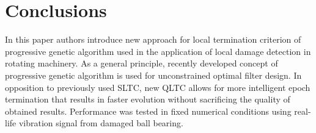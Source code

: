 \documentclass{svproc}
\begin{document}
\section{Conclusions}

In this paper authors introduce new approach for local termination criterion of progressive genetic algorithm used in the application of local damage detection in rotating machinery. As a general principle, recently developed concept of progressive genetic algorithm is used for unconstrained optimal filter design. In opposition to previously used SLTC, new QLTC allows for more intelligent epoch termination that results in faster evolution without sacrificing the quality of obtained results. Performance was tested in fixed numerical conditions using real-life vibration signal from damaged ball bearing.


\end{document}
